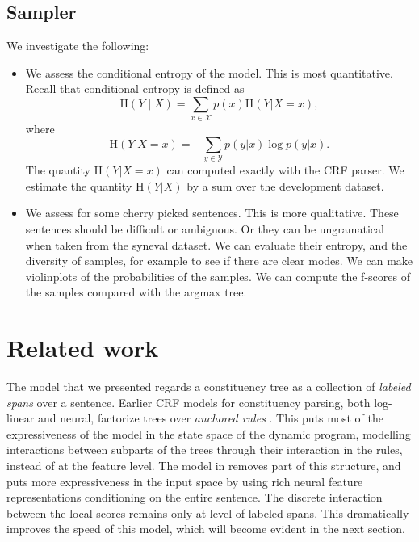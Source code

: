 \subsection{Sampler}
  We investigate the following:
  \begin{itemize}
    \item We assess the conditional entropy of the model. This is most quantitative. Recall that conditional entropy is defined as
    \begin{equation}
      \text{H}(Y \mid X ) = \sum_{x \in \mathcal{X}} p(x)\text{H}(Y|X = x),
    \end{equation}
    where
    \begin{equation}
      \text{H}(Y|X = x) = - \sum_{y \in \mathcal{Y}} p(y|x) \log p(y|x).
    \end{equation}
    The quantity $\text{H}(Y|X = x)$ can computed exactly with the CRF parser. We estimate the quantity $\text{H}(Y|X)$ by a sum over the development dataset.
    \item We assess for some cherry picked sentences. This is more qualitative. These sentences should be difficult or ambiguous. Or they can be ungramatical when taken from the syneval dataset. We can evaluate their entropy, and the diversity of samples, for example to see if there are clear modes. We can make violinplots of the probabilities of the samples. We can compute the f-scores of the samples compared with the argmax tree.
  \end{itemize}

\section{Related work}
  The model that we presented regards a constituency tree as a collection of \textit{labeled spans} over a sentence. Earlier CRF models for constituency parsing, both log-linear and neural, factorize trees over \textit{anchored rules} \citep{finkel2008crf,klein2015crf}. This puts most of the expressiveness of the model in the state space of the dynamic program, modelling interactions between subparts of the trees through their interaction in the rules, instead of at the feature level. The model in \citet{stern2017minimal} removes part of this structure, and puts more expressiveness in the input space by using rich neural feature representations conditioning on the entire sentence. The discrete interaction between the local scores remains only at level of labeled spans. This dramatically improves the speed of this model, which will become evident in the next section.

